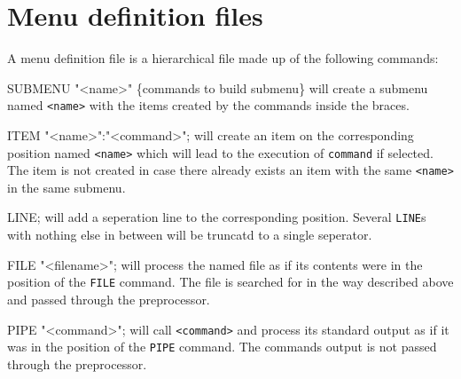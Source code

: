 \documentclass[10pt,a4paper]{article}
\newenvironment{ttdesc}[1]{
   \begin{list}{}{
          \renewcommand{\makelabel}[1]{\texttt{##1\hfill}}}}{\end{list}}
\begin{document}
\section{Menu definition files}
A menu definition file is a hierarchical file made up of the following commands:
\begin{ttdesc}{description}
\item[SUBMENU "<name>" \{\textsf{commands to build submenu}\}] will create a submenu named \texttt{<name>} with the items created by the commands inside the braces.
\item[ITEM "<name>":"<command>";] will create an item on the corresponding position named \texttt{<name>} which will lead to the execution of \texttt{command} if selected. The item is not created in case there already exists an item with the same \texttt{<name>} in the same submenu.
\item[LINE;] will add a seperation line to the corresponding position. Several \texttt{LINE}s with nothing else in between will be truncatd to a single seperator.
\item[FILE "<filename>";] will process the named file as if its contents were in the position of the \texttt{FILE} command. The file is searched for in the way described above and passed through the preprocessor.
\item[PIPE "<command>";] will call \texttt{<command>} and process its standard output as if it was in the position of the \texttt{PIPE} command. The commands output is not passed through the preprocessor.
\end{ttdesc}
\end{document}
